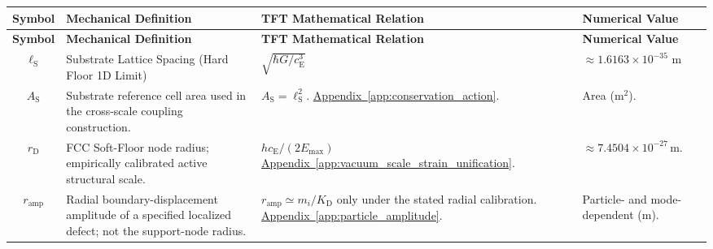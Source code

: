 \vspace{0.5cm}
\noindent
\renewcommand{\arraystretch}{1.6}
\begin{longtable}{@{} c p{5.5cm} p{4cm} p{3.5cm} @{}}
\toprule
\textbf{Symbol} & \textbf{Mechanical Definition} & \textbf{TFT Mathematical Relation} & \textbf{Numerical Value} \\
\midrule
\endfirsthead

\toprule
\textbf{Symbol} & \textbf{Mechanical Definition} & \textbf{TFT Mathematical Relation} & \textbf{Numerical Value} \\
\midrule
\endhead

$\ell_{\mathrm{S}}$ & Substrate Lattice Spacing (Hard Floor 1D Limit) & $\sqrt{\hbar G / c_{\mathrm{E}}^3}$ & $\approx 1.6163 \times 10^{-35}$ m \\

$A_{\mathrm S}$ & {\raggedright Substrate reference cell area used in the cross-scale coupling construction.\par} & {\raggedright $A_{\mathrm S}=\ell_{\mathrm S}^2$. \newline \hyperref[app:conservation_action]{Appendix~\ref*{app:conservation_action}}.\par} & {\raggedright Area ($\mathrm{m^2}$).\par} \\


$r_{\mathrm D}$ & {\raggedright FCC Soft-Floor node radius; empirically calibrated active structural scale.\par} & {\raggedright $hc_{\mathrm E}/(2E_{\mathrm{max}})$ \newline \hyperref[app:vacuum_scale_strain_unification]{Appendix~\ref*{app:vacuum_scale_strain_unification}}.\par} & {\raggedright $\approx7.4504\times10^{-27}\,\mathrm m$.\par} \\

$r_{\mathrm{amp}}$ & {\raggedright Radial boundary-displacement amplitude of a specified localized defect; not the support-node radius.\par} & {\raggedright $r_{\mathrm{amp}}\simeq m_i/K_{\mathrm D}$ only under the stated radial calibration. \newline \hyperref[app:particle_amplitude]{Appendix~\ref*{app:particle_amplitude}}.\par} & {\raggedright Particle- and mode-dependent ($\mathrm m$).\par} \\



\end{longtable}
